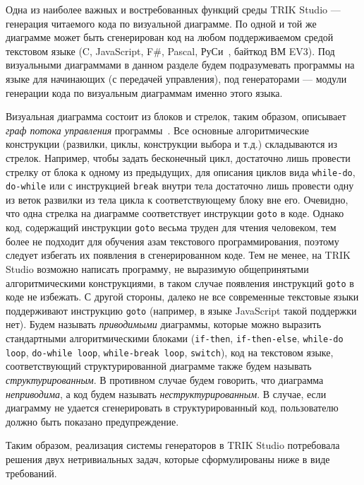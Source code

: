 \documentclass[conference]{IEEEtran}
\begin{document}
Одна из наиболее важных и востребованных функций среды TRIK Studio --- генерация читаемого кода по визуальной диаграмме. По одной и той же диаграмме может быть сгенерирован код на любом поддерживаемом средой текстовом языке (C, JavaScript, F\#, Pascal, РуСи~\cite{тереховотечественные}, байткод ВМ EV3). Под визуальными диаграммами в данном разделе будем подразумевать программы на языке для начинающих (с передачей управления), под генераторами --- модули генерации кода по визуальным диаграммам именно этого языка.

Визуальная диаграмма состоит из блоков и стрелок, таким образом, описывает \textit{граф потока управления} программы~\cite{steven1997advanced}. Все основные алгоритмические конструкции (развилки, циклы, конструкции выбора и т.д.) складываются из стрелок. Например, чтобы задать бесконечный цикл, достаточно лишь провести стрелку от блока к одному из предыдущих, для описания циклов вида \texttt{while-do}, \texttt{do-while} или с инструкцией \texttt{break} внутри тела достаточно лишь провести одну из веток развилки из тела цикла к соответствующему блоку вне его. Очевидно, что одна стрелка на диаграмме соответствует инструкции \texttt{goto} в коде. Однако код, содержащий инструкции \texttt{goto} весьма труден для чтения человеком, тем более не подходит для обучения азам текстового программирования, поэтому следует избегать их появления в сгенерированном коде. Тем не менее, на TRIK Studio возможно написать программу, не выразимую общепринятыми алгоритмическими конструкциями, в таком случае появления инструкций \texttt{goto} в коде не избежать. С другой стороны, далеко не все современные текстовые языки поддерживают инструкцию \texttt{goto} (например, в языке JavaScript такой поддержки нет). Будем называть \textit{приводимыми} диаграммы, которые можно выразить стандартными алгоритмическими блоками (\texttt{if-then}, \texttt{if-then-else}, \texttt{while-do loop}, \texttt{do-while loop}, \texttt{while-break loop}, \texttt{switch}), код на текстовом языке, соответствующий структурированной диаграмме также будем называть \textit{структурированным}. В противном случае будем говорить, что диаграмма \textit{неприводима}, а код будем называть \textit{неструктурированным}. В случае, если диаграмму не удается сгенерировать в структурированный код, пользователю должно быть показано предупреждение.

Таким образом, реализация системы генераторов в TRIK Studio потребовала решения двух нетривиальных задач, которые сформулированы ниже в виде требований.
\end{document}

